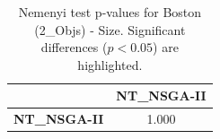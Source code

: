 \begin{table}[h!]
\centering
\scriptsize
\begin{tabular}{lc}
\toprule
 & NT\_NSGA-II \\
\midrule
\textbf{NT\_NSGA-II} & 1.000 \\
\bottomrule
\end{tabular}
\caption{Nemenyi test p-values for Boston (2_Objs) - Size. Significant differences ($p < 0.05$) are highlighted.}
\label{tab:nemenyi_nemenyi_Boston_2_Objs_Test_Size}
\end{table}